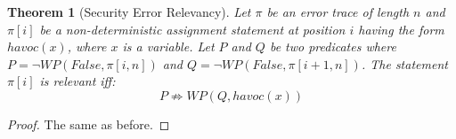 \documentclass{article}
\newcommand{\limp}{\Rightarrow}
\newtheorem{theorem}{Theorem}
\begin{document}
\begin{theorem}[Security Error Relevancy] 
Let $\pi$ be an error trace of length $n$ and $\pi[i]$ be a non-deterministic assignment statement at position $i$ having the form $havoc(x)$, where $x$ is a variable. Let $P$ and $Q$ be two predicates where $P = \neg WP(False, \pi[i,n])$ and $Q = \neg WP(False, \pi[i+1,n])$. The statement $\pi[i]$ is relevant iff:
 $$P \not\limp WP(Q,havoc(x))$$
\end{theorem}

\begin{proof}
The same as before.
\end{proof}
\end{document}
